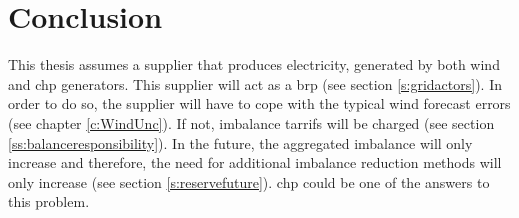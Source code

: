 \section{Conclusion}

This thesis assumes a supplier that produces electricity, generated by both wind and \gls{chp} generators. This supplier will act as a \gls{brp} (see section \ref{s:gridactors}). In order to do so, the supplier will have to cope with the typical wind forecast errors (see chapter \ref{c:WindUnc}). If not, imbalance tarrifs will be charged (see section \ref{ss:balanceresponsibility}). In the future, the aggregated imbalance will only increase and therefore, the need for additional imbalance reduction methods will only increase (see section \ref{s:reservefuture}). \Gls{chp} could be one of the answers to this problem.